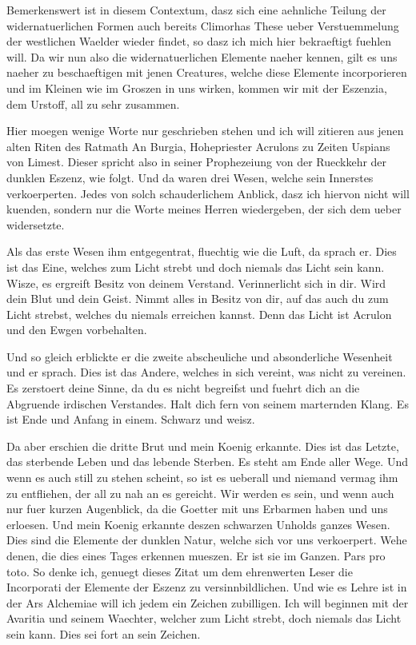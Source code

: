 \documentclass[a5paper,8pt]{book}
\begin{document}
Bemerkenswert ist in diesem Contextum, dasz sich eine aehnliche Teilung der widernatuerlichen Formen auch bereits Climorhas These ueber Verstuemmelung der westlichen Waelder wieder findet, so dasz ich mich hier bekraeftigt fuehlen will. Da wir nun also die widernatuerlichen Elemente naeher kennen, gilt es uns naeher zu beschaeftigen mit jenen Creatures, welche diese Elemente incorporieren und im Kleinen wie im Groszen in uns wirken, kommen wir mit der Eszenzia, dem Urstoff, all zu sehr zusammen.

Hier moegen wenige Worte nur geschrieben stehen und ich will zitieren aus jenen alten Riten des Ratmath An Burgia, Hohepriester Acrulons zu Zeiten Uspians von Limest. Dieser spricht also in seiner Prophezeiung von der Rueckkehr der dunklen Eszenz, wie folgt. Und da waren drei Wesen, welche sein Innerstes verkoerperten. Jedes von solch schauderlichem Anblick, dasz ich hiervon nicht will kuenden, sondern nur die Worte meines Herren wiedergeben, der sich dem ueber widersetzte.

Als das erste Wesen ihm entgegentrat, fluechtig wie die Luft, da sprach er. Dies ist das Eine, welches zum Licht strebt und doch niemals das Licht sein kann. Wisze, es ergreift Besitz von deinem Verstand. Verinnerlicht sich in dir. Wird dein Blut und dein Geist. Nimmt alles in Besitz von dir, auf das auch du zum Licht strebst, welches du niemals erreichen kannst. Denn das Licht ist Acrulon und den Ewgen vorbehalten.

Und so gleich erblickte er die zweite abscheuliche und absonderliche Wesenheit und er sprach. Dies ist das Andere, welches in sich vereint, was nicht zu vereinen. Es zerstoert deine Sinne, da du es nicht begreifst und fuehrt dich an die Abgruende irdischen Verstandes. Halt dich fern von seinem marternden Klang. Es ist Ende und Anfang in einem. Schwarz und weisz.

Da aber erschien die dritte Brut und mein Koenig erkannte. Dies ist das Letzte, das sterbende Leben und das lebende Sterben. Es steht am Ende aller Wege. Und wenn es auch still zu stehen scheint, so ist es ueberall und niemand vermag ihm zu entfliehen, der all zu nah an es gereicht. Wir werden es sein, und wenn auch nur fuer kurzen Augenblick, da die Goetter mit uns Erbarmen haben und uns erloesen.
Und mein Koenig erkannte deszen schwarzen Unholds ganzes Wesen. Dies sind die Elemente der dunklen Natur, welche sich vor uns verkoerpert. Wehe denen, die dies eines Tages erkennen mueszen. Er ist sie im Ganzen. Pars pro toto. So denke ich, genuegt dieses Zitat um dem ehrenwerten Leser die Incorporati der Elemente der Eszenz zu versinnbildlichen. Und wie es Lehre ist in der Ars Alchemiae will ich jedem ein Zeichen zubilligen. Ich will beginnen mit der Avaritia und seinem Waechter, welcher zum Licht strebt, doch niemals das Licht sein kann. Dies sei fort an sein Zeichen.
\end{document}
